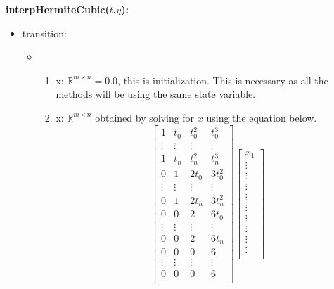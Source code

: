 \documentclass[12pt, titlepage]{article}
\begin{document}
\noindent \textbf{interpHermiteCubic($t$,$y$):}
\begin{itemize}
	\item transition: 
	
	\begin{itemize}
		\item 
		\begin{enumerate}
			\item x: $\mathbb{R}^{m \times n} = 0.0 $, this is initialization. 
			This is necessary as all the methods will be using the same state 
			variable.
			
			\item x: $\mathbb{R}^{m \times n}$ obtained by solving for $x$ 
			using 
			the equation below.
		\begin{equation*}
		\begin{bmatrix}
		1          & t_0       & t_0 ^{2}         & t_0 ^{3}         \\
		\vdots     & \vdots    & \vdots           & \vdots            \\
		1          & t_n       & t_n ^{2}         & t_n ^{3}          \\
		0          & 1         & 2 t_0            & 3 t_0 ^{2}         \\
		\vdots     & \vdots    & \vdots           & \vdots            \\
		0          & 1         & 2 t_n            & 3 t_n ^{2}          \\
		0          & 0         & 2                & 6 t_0              \\
		\vdots     & \vdots    & \vdots           & \vdots            \\
		0          & 0         & 2                & 6 t_n           \\
		0          & 0         & 0                & 6                 \\
		\vdots     & \vdots    & \vdots           & \vdots            \\
		0          & 0         & 0                & 6               \\
		\end{bmatrix}
		\begin{bmatrix}
		x_1  \\
		\vdots \\
		\vdots \\
		\vdots \\
		\vdots \\
		\vdots \\
		\vdots \\
		\vdots \\
		\vdots \\
		\vdots \\
		

\end{bmatrix}
\end{equation*}
\end{enumerate}
\end{itemize}
\end{itemize}
\end{document}
